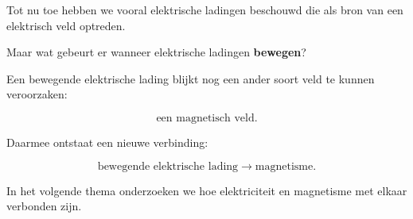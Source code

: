 \documentclass{ximera}
\begin{document}
Tot nu toe hebben we vooral elektrische ladingen beschouwd die als
bron van een elektrisch veld optreden.

Maar wat gebeurt er wanneer elektrische ladingen
\textbf{bewegen}?

Een bewegende elektrische lading blijkt nog een ander soort veld te
kunnen veroorzaken:

\[
\boxed{
\text{een magnetisch veld}.
}
\]

Daarmee ontstaat een nieuwe verbinding:

\[
\boxed{
\text{bewegende elektrische lading}
\longrightarrow
\text{magnetisme}.
}
\]

In het volgende thema onderzoeken we hoe elektriciteit en magnetisme
met elkaar verbonden zijn.
\end{document}

